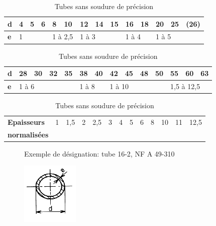 \begin{table}[!h]
 \begin{center}
  \begin{tabularx}{\linewidth}{|X|l|l|l|l|l|l|l|l|l|l|l|l|l|}
  \hline
  \textbf{d} & 4 & 5 & 6 & 8 & 10 & 12 & 14 & 15 & 16 & 18 & 20 & 25 & (26) \\
  \hline
  \textbf{e} & \multicolumn{3}{l|}{1} & \multicolumn{2}{l|}{1 à 2,5} & \multicolumn{3}{l|}{1 à 3} & \multicolumn{2}{l|}{1 à 4} & \multicolumn{3}{l|}{1 à 5} \\ 
  \hline
  \end{tabularx}
  \begin{tabularx}{\linewidth}{|X|l|l|l|l|l|l|l|l|l|l|l|l|l|}
  \hline
  \textbf{d} & 28 & 30 & 32 & 35 & 38 & 40 & 42 & 45 & 48 & 50 & 55 & 60 & 63 \\
  \hline
  \textbf{e} & \multicolumn{4}{l|}{1 à 6} & \multicolumn{2}{l|}{1 à 8} & \multicolumn{4}{l|}{1 à 10} & \multicolumn{3}{l|}{1,5 à 12,5} \\ 
  \hline
  \end{tabularx}
  \begin{tabularx}{\linewidth}{|X|l|l|l|l|l|l|l|l|l|l|l|l|}
  \hline
  \textbf{Epaisseurs } & 1 & 1,5 & 2 & 2,5 & 3 & 4 & 5 & 6 & 8 & 10 & 11 & 12,5 \\
  \textbf{normalisées} & & & & & & & & & & & & \\
  \hline
  \end{tabularx}
 \end{center}
  \caption{Tubes sans soudure de précision}
  \label{tab:tableau2}
\end{table}

\begin{figure}[!h]
 \begin{minipage}{0.69\linewidth}
 Exemple de désignation: tube 16-2, NF A 49-310
 \end{minipage}
 \hfill
 \begin{minipage}{0.3\linewidth}
  \centering\includegraphics[width=0.7\linewidth]{img/soudure2.png}
 \end{minipage}
\end{figure}

